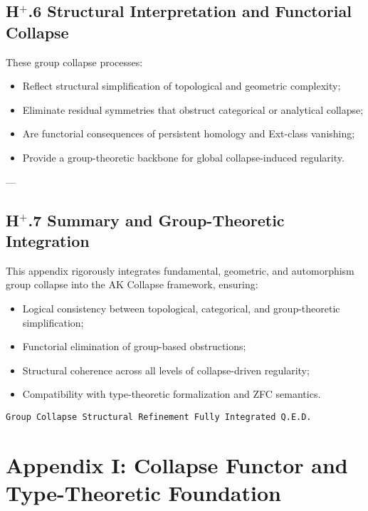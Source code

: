\documentclass[11pt]{article}
\begin{document}
\subsection*{H$^{+}$.6 Structural Interpretation and Functorial Collapse}

These group collapse processes:

\begin{itemize}
    \item Reflect structural simplification of topological and geometric complexity;
    \item Eliminate residual symmetries that obstruct categorical or analytical collapse;
    \item Are functorial consequences of persistent homology and Ext-class vanishing;
    \item Provide a group-theoretic backbone for global collapse-induced regularity.
\end{itemize}

---

\subsection*{H$^{+}$.7 Summary and Group-Theoretic Integration}

This appendix rigorously integrates fundamental, geometric, and automorphism group collapse into the AK Collapse framework, ensuring:

\begin{itemize}
    \item Logical consistency between topological, categorical, and group-theoretic simplification;
    \item Functorial elimination of group-based obstructions;
    \item Structural coherence across all levels of collapse-driven regularity;
    \item Compatibility with type-theoretic formalization and ZFC semantics.
\end{itemize}

\begin{flushright}
\texttt{Group Collapse Structural Refinement \quad Fully Integrated \quad Q.E.D.}
\end{flushright}



\section*{Appendix I: Collapse Functor and Type-Theoretic Foundation}
\end{document}

